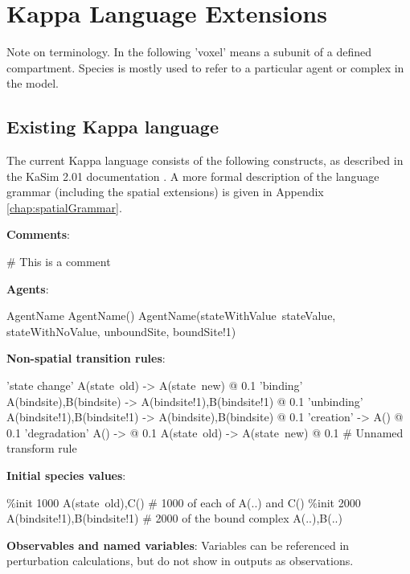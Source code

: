 \chapter{Kappa Language Extensions}

Note on terminology. In the following 'voxel' means a subunit of a defined compartment. Species is mostly used to refer to a particular agent or complex in the model.

\section{Existing Kappa language}

The current Kappa language consists of the following constructs, as described in the KaSim 2.01 documentation \citep{KaSimManual2012}. A more formal description of the language grammar (including the spatial extensions) is given in Appendix \ref{chap:spatialGrammar}.

\bigskip 
\textbf{Comments}:

\begin{kappasource}
# This is a comment
\end{kappasource} 

\textbf{Agents}:

\begin{kappasource}
AgentName
AgentName()
AgentName(stateWithValue~stateValue, stateWithNoValue, unboundSite, boundSite!1)
\end{kappasource} 


\textbf{Non-spatial transition rules}:

\begin{kappasource}
'state change' A(state~old) -> A(state~new) @ 0.1
'binding'      A(bindsite),B(bindsite) -> A(bindsite!1),B(bindsite!1) @ 0.1
'unbinding'    A(bindsite!1),B(bindsite!1) -> A(bindsite),B(bindsite) @ 0.1
'creation'     -> A() @ 0.1
'degradation'  A() -> @ 0.1
A(state~old) -> A(state~new) @ 0.1 # Unnamed transform rule
\end{kappasource} 

\textbf{Initial species values}:

\begin{kappasource}
\%init 1000 A(state~old),C()            # 1000 of each of A(..) and C()
\%init 2000 A(bindsite!1),B(bindsite!1) # 2000 of the bound complex A(..),B(..)
\end{kappasource} 

\textbf{Observables and named variables}: Variables can be referenced in perturbation calculations, but do not show in outputs as observations.

